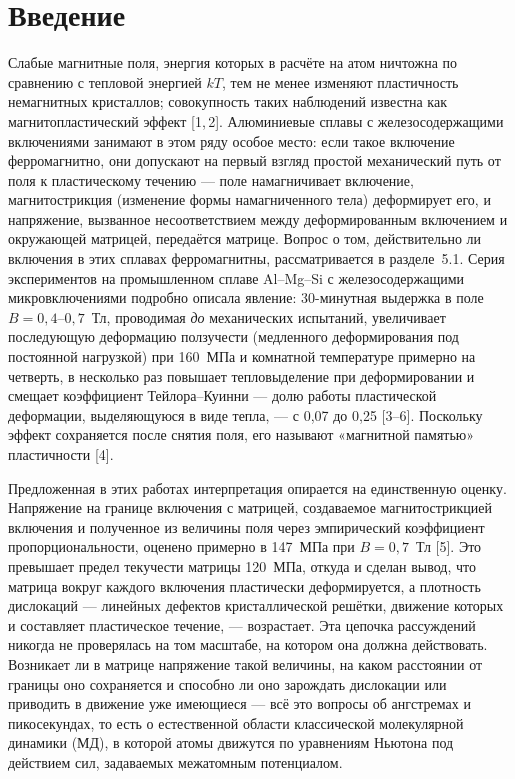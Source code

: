 \section{Введение}

Слабые магнитные поля, энергия которых в расчёте на атом ничтожна по
сравнению с тепловой энергией $kT$, тем не менее изменяют пластичность
немагнитных кристаллов; совокупность таких наблюдений известна как
магнитопластический эффект [1,\,2]. Алюминиевые сплавы с железосодержащими
включениями занимают в этом ряду особое место: если такое включение
ферромагнитно, они допускают на первый взгляд простой механический путь от
поля к пластическому течению --- поле намагничивает включение,
магнитострикция (изменение формы намагниченного тела) деформирует его, и
напряжение, вызванное несоответствием между деформированным включением и
окружающей матрицей, передаётся матрице. Вопрос о том, действительно ли
включения в этих сплавах ферромагнитны, рассматривается в разделе~5.1. Серия экспериментов на промышленном сплаве Al--Mg--Si с
железосодержащими микровключениями подробно описала явление: 30-минутная
выдержка в поле $B = 0{,}4$--$0{,}7$~Тл, проводимая \emph{до} механических
испытаний, увеличивает последующую деформацию ползучести (медленного
деформирования под постоянной нагрузкой) при 160~МПа и комнатной температуре
примерно на четверть, в несколько раз повышает тепловыделение при
деформировании и смещает коэффициент Тейлора--Куинни --- долю работы
пластической деформации, выделяющуюся в виде тепла, --- с 0{,}07 до 0{,}25
[3--6]. Поскольку эффект сохраняется после снятия поля, его называют
«магнитной памятью» пластичности [4].

Предложенная в этих работах интерпретация опирается на единственную оценку.
Напряжение на границе включения с матрицей, создаваемое магнитострикцией
включения и полученное из величины поля через эмпирический коэффициент
пропорциональности, оценено примерно в 147~МПа при $B = 0{,}7$~Тл [5]. Это
превышает предел текучести матрицы 120~МПа, откуда и сделан вывод, что
матрица вокруг каждого включения пластически деформируется, а плотность
дислокаций --- линейных дефектов кристаллической решётки, движение которых и
составляет пластическое течение, --- возрастает. Эта цепочка рассуждений
никогда не проверялась на том масштабе, на котором она должна действовать.
Возникает ли в матрице напряжение такой величины, на каком расстоянии от
границы оно сохраняется и способно ли оно зарождать дислокации или приводить
в движение уже имеющиеся --- всё это вопросы об ангстремах и пикосекундах,
то есть о естественной области классической молекулярной динамики (МД), в
которой атомы движутся по уравнениям Ньютона под действием сил, задаваемых
межатомным потенциалом.

